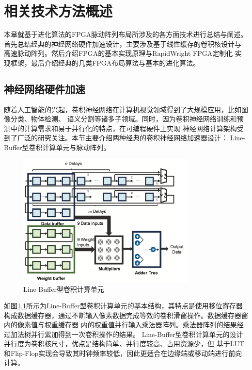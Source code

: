 \chapter{相关技术方法概述}


本章就基于进化算法的FPGA脉动阵列布局所涉及的各方面技术进行总结与阐述。
首先总结经典的神经网络硬件加速设计，主要涉及基于线性缓存的卷积核设计与
高速脉动阵列。然后介绍FPGA的基本实现原理与RapidWright FPGA定制化
实现框架，最后介绍经典的几类FPGA布局算法与基本的进化算法。

\section{神经网络硬件加速}

随着人工智能的兴起，卷积神经网络在计算机视觉领域得到了大规模应用，比如图像分类、物体检测、
语义分割等诸多子领域。同时，因为卷积神经网络训练和预测中的计算需求和易于并行化的特点，在可编程硬件上实现
神经网络计算架构受到了广泛的研究关注。本节主要介绍两种经典的卷积神经网络加速器设计：
Line-Buffer型卷积计算单元与脉动阵列。

\begin{figure}[h]
	\centering
	\includegraphics[width=0.8\textwidth]{figure/line-buffer}
	\caption{Line Buffer型卷积计算单元} 
	\label{fig:conv}
\end{figure}

如图\ref{fig:conv}所示为Line-Buffer型卷积计算单元的基本结构，其特点是使用移位寄存器
构成数据缓存器，通过不断输入像素数据完成等效的卷积滑窗操作。数据缓存器窗内的像素值与权重缓存器
内的权重值并行输入乘法器阵列。乘法器阵列的结果经过加法树并行累加得到一次卷积操作的结果。
Line-Buffer型卷积计算单元的设计并行度为卷积核尺寸，优点是结构简单、并行度较高、占用资源少，但
基于LUT和Flip-Flop实现会导致其时钟频率较低，因此更适合在边缘端或移动端进行前向计算。

